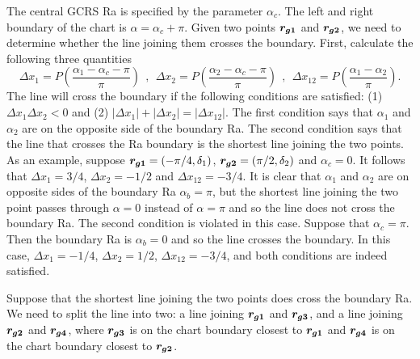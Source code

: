\documentclass[12pt]{article}
\newcommand \beq {\begin{equation}}
\newcommand \eeq {\end{equation}}
\newcommand{\ve}[1]{\mbox{\boldmath $#1$}}
\begin{document}
The central GCRS Ra is specified by the parameter $\alpha_c$. The left and 
right boundary of the chart is $\alpha=\alpha_c +\pi$. Given two points 
$\ve{r_{g1}}$ and $\ve{r_{g2}}$, we need to determine whether the line 
joining them crosses the boundary. First, calculate the following three quantities
\beq
  \Delta x_1 = P \left(\frac{\alpha_1-\alpha_c-\pi}{\pi}\right) \ \ , \ \ 
  \Delta x_2 = P\left(\frac{\alpha_2-\alpha_c-\pi}{\pi}\right) \ \ , \ \
  \Delta x_{12} = P\left(\frac{\alpha_1-\alpha_2}{\pi}\right) .
\eeq
The line will cross the 
boundary if the following conditions are satisfied: (1) $\Delta x_1 \Delta x_2 <0$ 
and (2) $|\Delta x_1| + |\Delta x_2| = |\Delta x_{12}|$. The first 
condition says that $\alpha_1$ and $\alpha_2$ are on the opposite side of the 
boundary Ra. The second condition says that the line that crosses the Ra boundary is 
the shortest line joining the two points. As an example, suppose 
$\ve{r_{g1}}=(-\pi/4,\delta_1)$, $\ve{r_{g2}}=(\pi/2,\delta_2)$ and 
$\alpha_c=0$. It follows that $\Delta x_1 = 3/4$, $\Delta x_2=-1/2$ and 
$\Delta x_{12}=-3/4$. It is clear that $\alpha_1$ and $\alpha_2$ are on 
opposite sides of the boundary Ra $\alpha_b=\pi$, but the shortest line 
joining the two point passes through $\alpha=0$ instead of $\alpha=\pi$ 
and so the line does not cross the boundary Ra. The second condition is 
violated in this case. Suppose that $\alpha_c=\pi$. Then the boundary Ra 
is $\alpha_b=0$ and so the line crosses the boundary. In this case, 
$\Delta x_1=-1/4$, $\Delta x_2=1/2$, $\Delta x_{12}=-3/4$, and both 
conditions are indeed satisfied.

Suppose that the shortest line joining the two points does cross the 
boundary Ra. We need to split the line into two: a line joining 
$\ve{r_{g1}}$ and $\ve{r_{g3}}$, and a line joining $\ve{r_{g2}}$ and 
$\ve{r_{g4}}$, where $\ve{r_{g3}}$ is on the chart boundary closest 
to $\ve{r_{g1}}$ and $\ve{r_{g4}}$ is on the chart boundary closest to 
$\ve{r_{g2}}$.
\end{document}
